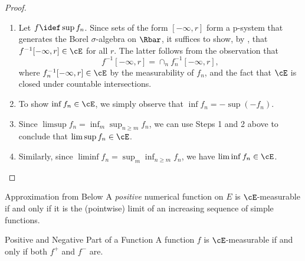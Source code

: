 \begin{proof}
	\begin{enumerate}
		\item Let \(f \idef \sup f_n\). Since sets of the form \([-\infty, r]\) form a p-system that generates the Borel \(\sigma\)-algebra on \(\Rbar\), it suffices to show, by , that \(f^{-1}[-\infty, r] \in \cE\) for all \(r\). The latter follows from the observation that
		      \begin{equation*}
			      f^{-1}[-\infty, r] = \cap_n f_n^{-1}[-\infty, r],
		      \end{equation*}
		      where \(f_n^{-1}[-\infty, r] \in \cE\) by the measurability of \(f_n\), and the fact that \(\cE\) is closed under countable intersections.
		\item To show \(\inf f_n \in \cE\), we simply observe that \(\inf f_n = - \sup(-f_n)\).
		\item Since \(\limsup f_n = \inf_m \sup_{n \ge m} f_n\), we can use Steps 1 and 2 above to conclude that \(\limsup f_n \in \cE\).
		\item Similarly, since \(\liminf f_n = \sup_m \inf_{n \ge m} f_n\), we have \(\liminf f_n \in \cE\).
	\end{enumerate}
\end{proof}

\begin{thm}{Approximation from Below}{}
	A \textit{positive} numerical function on \(E\) is \(\cE\)-measurable if and only if it is the (pointwise) limit of an increasing sequence of simple functions.
\end{thm}

\begin{thm}{Positive and Negative Part of a Function}{}
	A function \(f\) is \(\cE\)-measurable if and only if both \(f^+\) and \(f^-\) are.
\end{thm}

